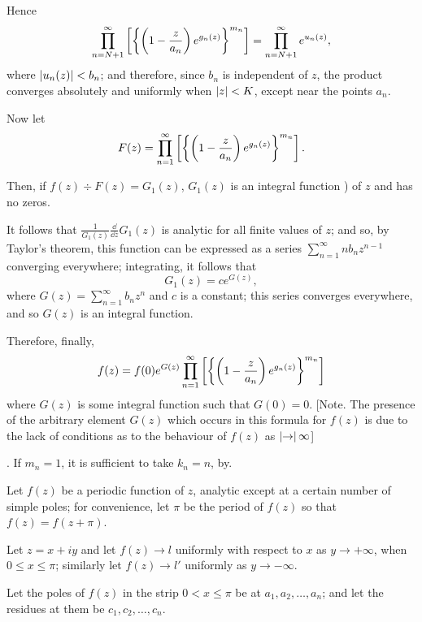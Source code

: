 Hence
$$
\prod_{n = N+1}^{\infty}
\left[ 
  \left\{ 
    \left( 
      1
      -
      \frac{z}{a_{n}}
     \right)
    e^{g_{n}(z)}
   \right\}^{m_{n}}
 \right]
=
\prod_{n = N+1}^{\infty}
e^{u_{n}(z)},
$$
where
$ \left|  u_{n}(z)  \right| < b_{n} $;
and therefore, since $b_{n}$ is independent of $z$, the
product converges absolutely and uniformly when
$\left| z \right| < K$, except near the points $a_{n}$.
%
%

Now let
$$
F(z)
=
\prod_{n=1}^{\infty}
\left[ 
  \left\{ 
    \left( 
      1
      -
      \frac{z}{a_{n}}
     \right)
    e^{g_{n}(z)}
   \right\}^{m_{n}}
 \right].
$$

Then, if $f(z) \div F(z) = G_{1}(z)$, $G_{1}(z)$ is an integral
function ) of $z$ and has no zeros.

It follows that
$\frac{1}{G_{1}(z)} \frac{\dd}{\dd z} G_{1}(z)$
is analytic for all finite values of $z$; and so, by Taylor's theorem,
this function can be expressed as a series $\sum_{n=1}^{\infty} n
b_{n} z^{n-1}$ converging everywhere; integrating, it follows that
$$
G_{1}(z) = c e^{G(z)},
$$
where $G(z) = \sum_{n=1}^{\infty} b_{n} z^{n}$ and $c$ is a constant;
this series converges everywhere, and so $G(z)$ is an integral
function.

Therefore, finally,
$$
f(z)
=
f(0)
e^{G(z)}
\prod_{n=1}^{\infty}
\left[ 
  \left\{ 
    \left( 
      1
      -
      \frac{z}{a_{n}}
     \right)
    e^{g_{n}(z)}
   \right\}^{m_{n}}
 \right]
$$
where $G(z)$ is some integral function such that $G(0) = 0$.
[Note. The presence of the arbitrary element $G(z)$ which occurs in
this formula for $f(z)$ is due to the lack of conditions as to the
behaviour of $f(z)$ as $\left| \rightarrow \right| \infty$]

\corollary. If $m_{n} =1$, it is
sufficient to take $k_{n} = n$, by.

Let $f(z)$ be a periodic function of $z$, analytic except at a certain
number of simple poles; for convenience, let $\pi$ be the period of
$f(z)$ so that $f(z) = f(z + \pi)$.

Let $z = x + iy$ and let $f(z) \rightarrow l$ uniformly with respect
to $x$ as $y \rightarrow +\infty$,
when $0 \leq x \leq \pi$; similarly let $f(z) \rightarrow l'$
uniformly as $y \rightarrow -\infty$.

Let the poles of $f(z)$ in the strip $0 < x \leq \pi$ be at
$a_{1}, a_{2}, \ldots, a_{n}$; and
let the residues at them be $c_{1}, c_{2}, \ldots, c_{n}$.

